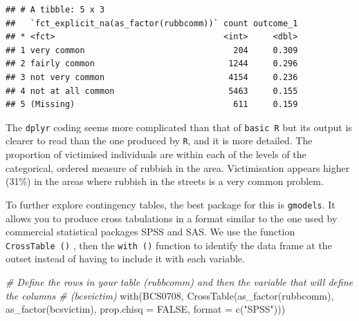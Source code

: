 \documentclass[
]{book}
\newenvironment{Shaded}{\begin{snugshade}}{\end{snugshade}}
\newcommand{\AttributeTok}[1]{\textcolor[rgb]{0.77,0.63,0.00}{#1}}
\newcommand{\CommentTok}[1]{\textcolor[rgb]{0.56,0.35,0.01}{\textit{#1}}}
\newcommand{\ConstantTok}[1]{\textcolor[rgb]{0.00,0.00,0.00}{#1}}
\newcommand{\FunctionTok}[1]{\textcolor[rgb]{0.00,0.00,0.00}{#1}}
\newcommand{\NormalTok}[1]{#1}
\newcommand{\StringTok}[1]{\textcolor[rgb]{0.31,0.60,0.02}{#1}}
\begin{document}
\begin{verbatim}
## # A tibble: 5 x 3
##   `fct_explicit_na(as_factor(rubbcomm))` count outcome_1
## * <fct>                                  <int>     <dbl>
## 1 very common                              204     0.309
## 2 fairly common                           1244     0.296
## 3 not very common                         4154     0.236
## 4 not at all common                       5463     0.155
## 5 (Missing)                                611     0.159
\end{verbatim}

The \texttt{dplyr} coding seems more complicated than that of \texttt{basic\ R} but its output is clearer to read than the one produced by \texttt{R}, and it is more detailed. The proportion of victimised individuals are within each of the levels of the categorical, ordered measure of rubbish in the area. Victimisation appears higher (31\%) in the areas where rubbish in the streets is a very common problem.

To further explore contingency tables, the best package for this is \texttt{gmodels}. It allows you to produce cross tabulations in a format similar to the one used by commercial statistical packages SPSS and SAS. We use the function \texttt{CrossTable\ ()} , then the \texttt{with\ ()} function to identify the data frame at the outset instead of having to include it with each variable.

\begin{Shaded}
\begin{Highlighting}[]
\CommentTok{\# Define the rows in your table (rubbcomm) and then the variable that will define the columns \# (bcsvictim)}
\FunctionTok{with}\NormalTok{(BCS0708, }\FunctionTok{CrossTable}\NormalTok{(}\FunctionTok{as\_factor}\NormalTok{(rubbcomm), }
                         \FunctionTok{as\_factor}\NormalTok{(bcsvictim), }
\AttributeTok{prop.chisq =} \ConstantTok{FALSE}\NormalTok{, }
\AttributeTok{format =} \FunctionTok{c}\NormalTok{(}\StringTok{"SPSS"}\NormalTok{)))}
\end{Highlighting}
\end{Shaded}
\end{document}
